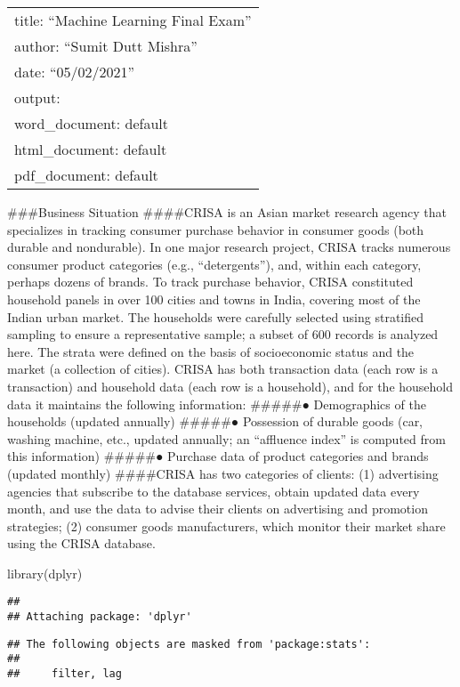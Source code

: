 \documentclass[
]{article}
\author{}
\date{\vspace{-2.5em}}
\newenvironment{Shaded}{\begin{snugshade}}{\end{snugshade}}
\newcommand{\FunctionTok}[1]{\textcolor[rgb]{0.00,0.00,0.00}{#1}}
\newcommand{\NormalTok}[1]{#1}
\begin{document}
\begin{longtable}[]{@{}l@{}}
\toprule
\endhead
title: ``Machine Learning Final Exam''\tabularnewline
author: ``Sumit Dutt Mishra''\tabularnewline
date: ``05/02/2021''\tabularnewline
output:\tabularnewline
word\_document: default\tabularnewline
html\_document: default\tabularnewline
pdf\_document: default\tabularnewline
\bottomrule
\end{longtable}

\#\#\#Business Situation \#\#\#\#CRISA is an Asian market research
agency that specializes in tracking consumer purchase behavior in
consumer goods (both durable and nondurable). In one major research
project, CRISA tracks numerous consumer product categories (e.g.,
``detergents''), and, within each category, perhaps dozens of brands. To
track purchase behavior, CRISA constituted household panels in over 100
cities and towns in India, covering most of the Indian urban market. The
households were carefully selected using stratified sampling to ensure a
representative sample; a subset of 600 records is analyzed here. The
strata were defined on the basis of socioeconomic status and the market
(a collection of cities). CRISA has both transaction data (each row is a
transaction) and household data (each row is a household), and for the
household data it maintains the following information: \#\#\#\#\#●
Demographics of the households (updated annually) \#\#\#\#\#● Possession
of durable goods (car, washing machine, etc., updated annually; an
``affluence index'' is computed from this information) \#\#\#\#\#●
Purchase data of product categories and brands (updated monthly)
\#\#\#\#CRISA has two categories of clients: (1) advertising agencies
that subscribe to the database services, obtain updated data every
month, and use the data to advise their clients on advertising and
promotion strategies; (2) consumer goods manufacturers, which monitor
their market share using the CRISA database.

\begin{Shaded}
\begin{Highlighting}[]
\FunctionTok{library}\NormalTok{(dplyr)}
\end{Highlighting}
\end{Shaded}

\begin{verbatim}
## 
## Attaching package: 'dplyr'
\end{verbatim}

\begin{verbatim}
## The following objects are masked from 'package:stats':
## 
##     filter, lag
\end{verbatim}
\end{document}
